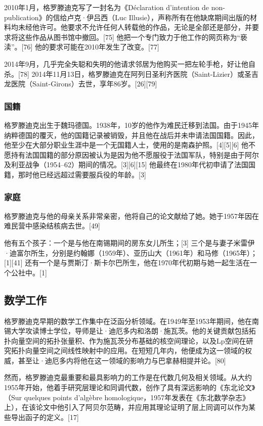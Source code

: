 2010年1月，格罗滕迪克写了一封名为《Déclaration d'intention de non-publication》的信给卢克·伊吕西（Luc Illusie），声称所有在他缺席期间出版的材料均未经他许可。他要求不允许任何人转载他的作品，无论是全部还是部分，并要求将这些作品从图书馆中撤回。[75] 他把一个专门致力于他工作的网页称为“亵渎”。[76] 他的要求可能在2010年发生了改变。[77]

2014年9月，几乎完全失聪和失明的他请求邻居为他购买一把左轮手枪，好让他自杀。[78] 2014年11月13日，格罗滕迪克在阿列日圣利齐医院（Saint-Lizier）或圣吉龙医院（Saint-Girons）去世，享年86岁。[26][79]
\subsubsection{国籍}
格罗滕迪克出生于魏玛德国。1938年，10岁的他作为难民迁移到法国。由于1945年纳粹德国的覆灭，他的国籍记录被销毁，并且他在战后并未申请法国国籍。因此，他至少在大部分职业生涯中是一个无国籍人士，使用的是南森护照。[4][5][6] 他不愿持有法国国籍的部分原因被认为是因为他不愿服役于法国军队，特别是由于阿尔及利亚战争（1954–62）期间的情况。[3][6][15] 他最终在1980年代初申请了法国国籍，那时他已经远超过需要服兵役的年龄。[3]
\subsubsection{家庭}
格罗滕迪克与他的母亲关系非常亲密，他将自己的论文献给了她。她于1957年因在难民营中感染结核病去世。[49]

他有五个孩子：一个是与他在南锡期间的房东女儿所生；[3] 三个是与妻子米雷伊·迪富尔所生，分别是约翰娜（1959年）、亚历山大（1961年）和马修（1965年）；[1][41] 还有一个是与贾斯汀·斯卡尔巴所生，他在1970年代初期与她一起生活在一个公社中。[1]
\subsection{数学工作}
格罗滕迪克早期的数学工作集中在泛函分析领域。在1949年至1953年期间，他在南锡大学攻读博士学位，导师是让·迪厄多内和洛朗·施瓦茨。他的关键贡献包括拓扑向量空间的拓扑张量积、作为施瓦茨分布基础的核空间理论，以及Lp空间在研究拓扑向量空间之间线性映射中的应用。在短短几年内，他便成为这一领域的权威，甚至让·迪厄多内将他在这一领域的影响力与巴拿赫相提并论。[80]

然而，格罗滕迪克最重要和最具影响力的工作是在代数几何及相关领域。从大约1955年开始，他着手研究层理论和同调代数，创作了具有深远影响的《东北论文》（Sur quelques points d'algèbre homologique，1957年发表在《东北数学杂志》上），在该论文中他引入了阿贝尔范畴，并应用其理论证明了层上同调可以作为某些导出函子的定义。[17]

